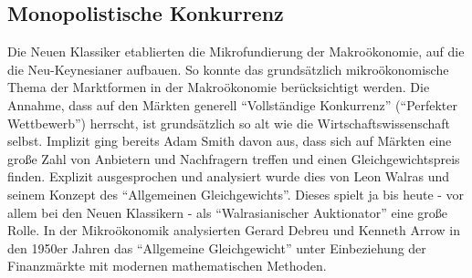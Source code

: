 \subsection{Monopolistische Konkurrenz}
\label{Monopol}
Die Neuen Klassiker etablierten die Mikrofundierung der Makroökonomie, auf die die Neu-Keynesianer aufbauen. So konnte das grundsätzlich mikroökonomische Thema der Marktformen in der Makroökonomie berücksichtigt werden. Die Annahme, dass auf den Märkten generell "`Vollständige Konkurrenz"' ("`Perfekter Wettbewerb"') herrscht, ist grundsätzlich so alt wie die Wirtschaftswissenschaft selbst. Implizit ging bereits Adam Smith davon aus, dass sich auf Märkten eine große Zahl von Anbietern und Nachfragern treffen und einen Gleichgewichtspreis finden. Explizit ausgesprochen und analysiert wurde dies von Leon Walras und seinem Konzept des "`Allgemeinen Gleichgewichts"'. Dieses spielt ja bis heute - vor allem bei den Neuen Klassikern - als "`Walrasianischer Auktionator"' eine große Rolle. In der Mikroökonomik analysierten Gerard Debreu und Kenneth Arrow in den 1950er Jahren das "`Allgemeine Gleichgewicht"' unter Einbeziehung der Finanzmärkte mit modernen mathematischen Methoden. 
